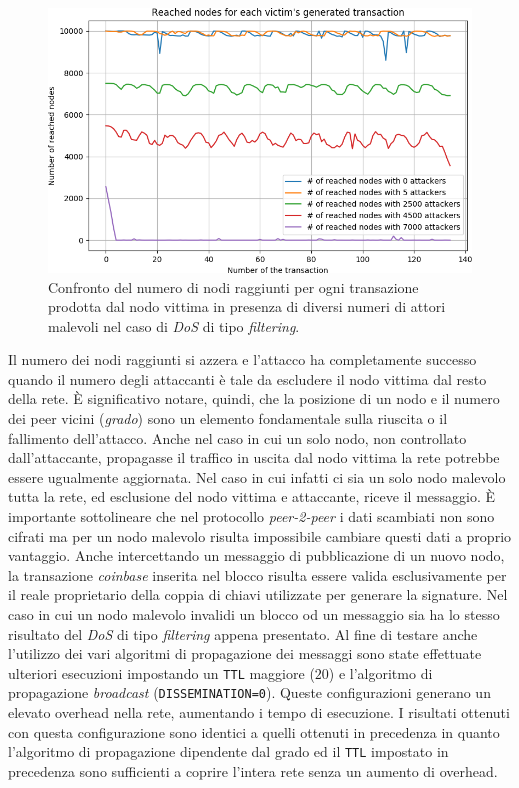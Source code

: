 \begin{figure}[H]
    \centering
    \includegraphics[width=\textwidth]{./images/DOS-mix.png}
    \caption{Confronto del numero di nodi raggiunti per ogni transazione prodotta dal nodo vittima in presenza di diversi numeri di attori malevoli nel caso di \textit{DoS} di tipo \textit{filtering}.}
    \label{fig:dosmix}
\end{figure}
Il numero dei nodi raggiunti si azzera e l'attacco ha completamente successo quando il numero degli attaccanti è tale da escludere il nodo vittima dal resto della rete.\newline
È significativo notare, quindi, che la posizione di un nodo e il numero dei peer vicini (\textit{grado}) sono un elemento fondamentale sulla riuscita o il fallimento dell'attacco. Anche nel caso in cui un solo nodo, non controllato dall'attaccante, propagasse il traffico in uscita dal nodo vittima la rete potrebbe essere ugualmente aggiornata. Nel caso in cui infatti ci sia un solo nodo malevolo tutta la rete, ed esclusione del nodo vittima e attaccante, riceve il messaggio.\newline
È importante sottolineare che nel protocollo \textit{peer-2-peer} i dati scambiati non sono cifrati ma per un nodo malevolo risulta impossibile cambiare questi dati a proprio vantaggio. Anche intercettando un messaggio di pubblicazione di un nuovo nodo, la transazione \textit{coinbase} inserita nel blocco risulta essere valida esclusivamente per il reale proprietario della coppia di chiavi utilizzate per generare la signature. Nel caso in cui un nodo malevolo invalidi un blocco od un messaggio sia ha lo stesso risultato del \textit{DoS} di tipo \textit{filtering} appena presentato.\newline
Al fine di testare anche l'utilizzo dei vari algoritmi di propagazione dei messaggi sono state effettuate ulteriori esecuzioni impostando un \texttt{TTL} maggiore ($20$) e l'algoritmo di propagazione \textit{broadcast} (\texttt{DISSEMINATION=0}). Queste configurazioni generano un elevato overhead nella rete, aumentando i tempo di esecuzione. I risultati ottenuti con questa configurazione sono identici a quelli ottenuti in precedenza in quanto l'algoritmo di propagazione dipendente dal grado ed il \texttt{TTL} impostato in precedenza sono sufficienti a coprire l'intera rete senza un aumento di overhead.\newline
